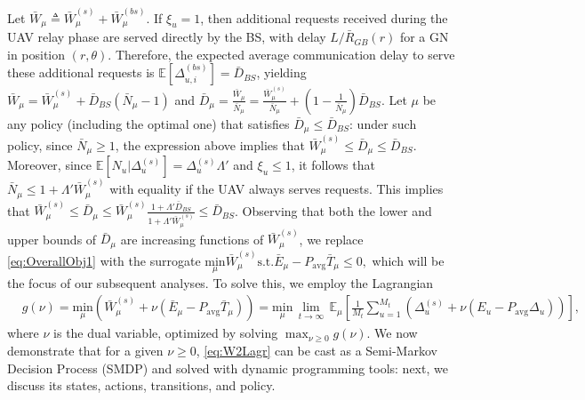 \documentclass[12pt, draftcls, onecolumn]{IEEEtran}
\theoremstyle{plain}
\theoremstyle{definition}
\theoremstyle{remark}
\begin{document}
Let $\bar{W}_{\mu}{\triangleq}\bar{W}_{\mu}^{(s)}{+}\bar{W}_{\mu}^{(bs)}$. If $\xi_u{=}1$, then additional requests received during the UAV relay phase are served directly by the BS, with delay $L/\bar{R}_{GB}(r)$ for a GN in position $(r,\theta)$. Therefore, the expected average communication delay to serve these additional requests is $\mathbb E[\Delta_{u,i}^{(bs)}]{=}\bar{D}_{BS}$, yielding $\bar{W}_{\mu}{=}\bar{W}_{\mu}^{(s)}{+}\bar{D}_{BS}(\bar{N}_{\mu}{-}1)$ and
 $\bar{D}_{\mu}{=}\frac{\bar{W}_{\mu}}{\bar{N}_{\mu}}{=}\frac{\bar{W}_{\mu}^{(s)}}{\bar{N}_{\mu}}{+}\left(1{-}\frac{1}{\bar N_{\mu}}\right)\bar{D}_{BS}$. 
 Let $\mu$ be any policy (including the optimal one) that satisfies $\bar{D}_{\mu}{\leq}\bar{D}_{BS}$: under such policy, since $\bar{N}_{\mu}{\geq}1$, the expression above implies that $\bar{W}_{\mu}^{(s)}{\leq}\bar{D}_{\mu}{\leq}\bar{D}_{BS}$. 
Moreover, since
$\mathbb{E}[N_{u}|\Delta_{u}^{(s)}]{=}\Delta_{u}^{(s)}\Lambda'$ and $\xi_{u}{\leq}1$, it follows that $\bar{N}_{\mu}{\leq}1{+}\Lambda'\bar{W}_{\mu}^{(s)}$
with  equality if the UAV always serves requests. 
This implies that $\bar{W}_{\mu}^{(s)}{\leq}\bar{D}_{\mu}{\leq}\bar{W}_{\mu}^{(s)}\frac{1{+}\Lambda'\bar{D}_{BS}}{1{+}\Lambda'\bar{W}_{\mu}^{(s)}}{\leq}\bar{D}_{BS}$. 
Observing that both the lower and upper bounds of $\bar{D}_{\mu}$ are increasing functions of $\bar{W}_{\mu}^{(s)}$, we
replace \eqref{eq:OverallObj1} with the surrogate 
 $\underset{\mu}{\mathrm{min}}\bar{W}_{\mu}^{(s)}\mathrm{ s.t. }\bar{E}_{\mu}{-}P_{\mathrm{avg}}\bar{T}_{\mu}{\leq}0,$ which will be the focus of our subsequent analyses. To solve this, we employ the Lagrangian
\begin{align}\label{eq:W2Lagr}
    &g(\nu){=}\underset{\mu}{\mathrm{min}} \left( \bar{W}_{\mu}^{(s)} + \nu (\bar{E}_{\mu}-P_{\mathrm{avg}}\bar{T}_{\mu}) \right)
    {=}\underset{\mu}{\mathrm{min}}\, \lim_{t \rightarrow \infty} \, \mathbb{E}_{\mu} \left[\frac{1}{M_t} \sum_{u = 1}^{M_t}\left( \Delta_u^{(s)} + \nu (E_u - P_{\mathrm{avg}}\Delta_u) \right) \right],\!\!
\end{align}
where $\nu$ is the dual variable, optimized by solving $\max_{\nu{\geq}0}g(\nu)$. We now demonstrate that for a given $\nu{\geq}0$, \eqref{eq:W2Lagr} can be cast as a Semi-Markov Decision Process (SMDP) and solved with dynamic programming tools: next, we discuss its states, actions, transitions, and policy. 
\end{document}
